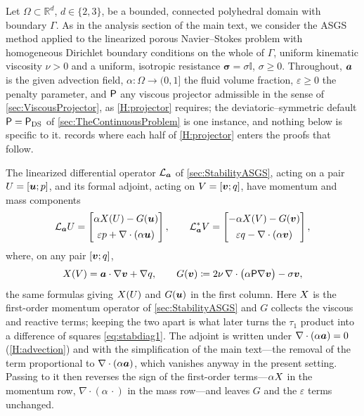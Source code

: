 Let $\Omega\subset\mathbb{R}^d$, $d\in\{2,3\}$, be a bounded, connected polyhedral domain with
boundary $\Gamma$. As in the analysis section of the main text, we consider the ASGS
method applied to the linearized porous Navier--Stokes problem with homogeneous Dirichlet
boundary conditions on the whole of $\Gamma$, uniform kinematic viscosity $\nu>0$ and a
uniform, isotropic resistance $\boldsymbol{\sigma}=\sigma\mathbb{I}$, $\sigma\ge 0$. Throughout,
$\boldsymbol{a}$ is the given advection field, $\alpha:\Omega\to(0,1]$ the fluid volume fraction,
$\varepsilon\ge 0$ the penalty parameter, and $\mathsf{P}$ any viscous projector admissible in
the sense of \cref{sec:ViscousProjector}, as \cref{H:projector} requires; the
deviatoric--symmetric default $\mathsf{P}=\mathsf{P}_{\mathrm{DS}}$ of \cref{sec:TheContinuousProblem} is one
instance, and nothing below is specific to it.  records where each half of
\cref{H:projector} enters the proofs that follow.

The linearized differential operator $\mathcal{L}_{\boldsymbol{a}}$ of \cref{sec:StabilityASGS}, acting on a
pair $U=[\boldsymbol{u};p]$, and its formal adjoint, acting on $V=[\boldsymbol{v};q]$, have momentum and mass
components
\begin{equation}\label{eq:StrongOperator}
  \mathcal{L}_{\boldsymbol{a}}U =
  \begin{bmatrix}
    \alpha X(U)-G(\boldsymbol{u})\\[4pt]
    \varepsilon p + \nabla\cdot(\alpha\boldsymbol{u})
  \end{bmatrix},
  \qquad
  \mathcal{L}_{\boldsymbol{a}}^{*}V =
  \begin{bmatrix}
    -\alpha X(V)-G(\boldsymbol{v})\\[4pt]
    \varepsilon q - \nabla\cdot(\alpha\boldsymbol{v})
  \end{bmatrix},
\end{equation}
where, on any pair $[\boldsymbol{v};q]$,
\begin{equation}\label{eq:XG}
  X(V) = \boldsymbol{a}\cdot\nabla\boldsymbol{v} + \nabla q,
  \qquad
  G(\boldsymbol{v}) \coloneqq 2\nu\,\nabla\cdot\bigl(\alpha\mathsf{P}\nabla\boldsymbol{v}\bigr) - \sigma\boldsymbol{v} ,
\end{equation}
the same formulas giving $X(U)$ and $G(\boldsymbol{u})$ in the first column. Here $X$ is the
first{\hyp}order momentum operator of \cref{sec:StabilityASGS} and $G$ collects the viscous and
reactive terms; keeping the two apart is what later turns the $\tau_1$ product into a difference
of squares \eqref{eq:stabdiag1}. The adjoint is written under $\nabla\cdot(\alpha\boldsymbol{a})=0$
(\cref{H:advection}) and with the simplification of the main text---the removal of the term
proportional to $\nabla\cdot(\alpha\boldsymbol{a})$, which vanishes anyway in the present setting. Passing to
it then reverses the sign of the first{\hyp}order terms---$\alpha X$ in the momentum row,
$\nabla\cdot(\alpha\,\cdot)$ in the mass row---and leaves $G$ and the $\varepsilon$ terms
unchanged.

